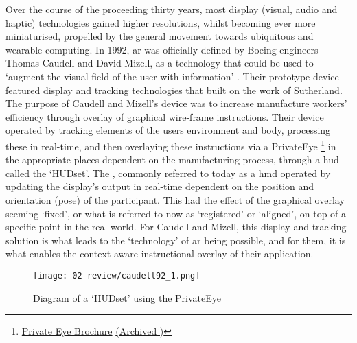 Over the course of the proceeding thirty years, most display (visual, audio and haptic) technologies gained higher resolutions, whilst becoming ever more miniaturised, propelled by the general movement towards ubiquitous and wearable computing. In 1992, \gls{ar} was officially defined by Boeing engineers Thomas Caudell and David Mizell, as a technology that could be used to `augment the visual field of the user with information' \citeyearpar{caudell1992}. Their prototype device featured display and tracking technologies that built on the work of Sutherland. The purpose of Caudell and Mizell's device was to increase manufacture workers' efficiency through overlay of graphical wire-frame instructions. Their device operated by tracking elements of the users environment and body, processing these in real-time, and then overlaying these instructions via a PrivateEye \footnote{\href{https://billbuxton.com/Private_Eye_Brochure.pdf}{Private Eye Brochure} \href{https://web.archive.org/web/20221226033457/https://billbuxton.com/Private_Eye_Brochure.pdf}{(Archived \faArchive)}} in the appropriate places dependent on the manufacturing process, through a \gls{hud} called the `HUDset'. The , commonly referred to today as a \gls{hmd} operated by updating the display's output in real-time dependent on the position and orientation (pose) of the participant. This had the effect of the graphical overlay seeming `fixed', or what is referred to now as `registered' or `aligned', on top of a specific point in the real world. For Caudell and Mizell, this display and tracking solution is what leads to the `technology' of \gls{ar} being possible, and for them, it is what enables the context-aware instructional overlay of their application.

\begin{figure}[H]
    \centering
    \texttt{[image: 02-review/caudell92\_1.png]}
    \captionsetup{justification=centering,margin=1.5cm}
    \caption{Diagram of a `HUDset' using the PrivateEye \citep[in][]{caudell1992}}\label{fig: caudellprivateeye}
\end{figure}

